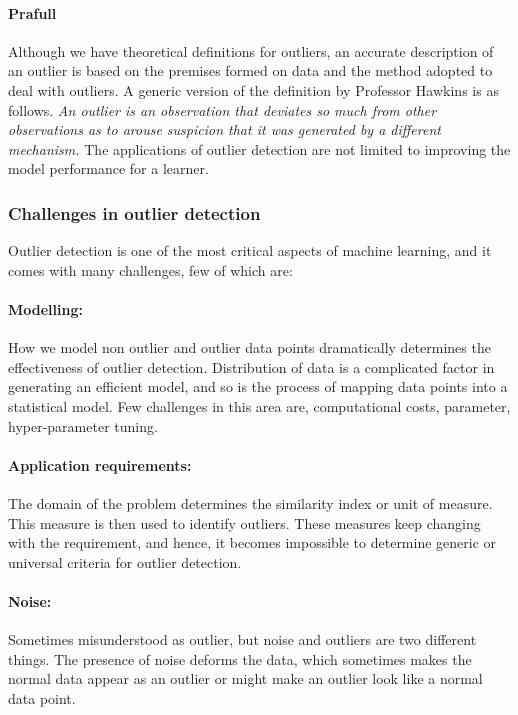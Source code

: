 \documentclass[runningheads]{llncs}
\begin{document}
\paragraph{Prafull} Although we have theoretical definitions for outliers, an accurate description of an outlier is based on the premises formed on data and the method adopted to deal with outliers. A generic version of the definition by Professor Hawkins is as follows. \textit{An outlier is an observation that deviates so much from other observations as to arouse suspicion that it was generated by a different mechanism.
} The applications of outlier detection are not limited to improving the model performance for a learner. 

\subsubsection{Challenges in outlier detection}
Outlier detection is one of the most critical aspects of machine learning, and it comes with many challenges, few of which are:

\paragraph*{Modelling:} How we model non outlier and outlier data points dramatically determines the effectiveness of outlier detection. Distribution of data is a complicated factor in generating an efficient model, and so is the process of mapping data points into a statistical model. Few challenges in this area are, computational costs, parameter, hyper-parameter tuning.

\paragraph*{Application requirements:} The domain of the problem determines the similarity index or unit of measure. This measure is then used to identify outliers. These measures keep changing with the requirement, and hence, it becomes impossible to determine generic or universal criteria for outlier detection. 

\paragraph*{Noise:} Sometimes misunderstood as outlier, but noise and outliers are two different things. The presence of noise deforms the data, which sometimes makes the normal data appear as an outlier or might make an outlier look like a normal data point.
\end{document}
